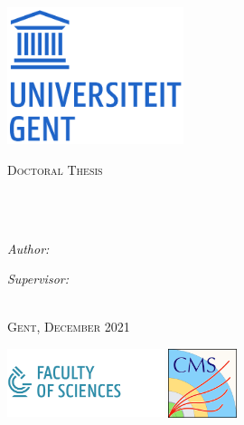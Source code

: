 \begin{titlepage}
\includegraphics[height=4cm]{Figures/logo_Ugent}\\


\begin{center}
\vspace*{.01\textheight}
{\scshape\huge \univname\par}\vspace{1.5cm} %
\textsc{\Large Doctoral Thesis}\\[0.5cm] %

\HRule \\[0.4cm] %
{\huge \bfseries \ttitle\par}\vspace{0.4cm} %
\HRule \\[1.5cm] %
 
\begin{minipage}[t]{0.4\textwidth}
\begin{flushleft} \Large
\emph{Author:}\\
{\authorname} %
\end{flushleft}
\end{minipage}
\begin{minipage}[t]{0.4\textwidth}
\begin{flushright} \Large
\emph{Supervisor:} \\
{\supname} %
\end{flushright}
\end{minipage}\\[1cm]
 
\vspace{8mm}
{\scshape \Large Gent, December 2021}\\[1cm] %
\vspace{8mm}


\includegraphics[clip,trim=0.cm 0.4cm 0.cm 0.4cm, height=2cm]{Figures/UGent_WE_logo.png}
\hfill
\includegraphics[height=2cm]{Figures/CMSlogo.png}



\end{center}
\end{titlepage}